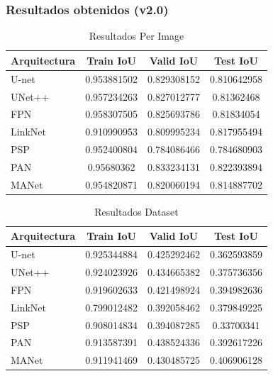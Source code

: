 \begin{frame}[allowframebreaks]
\frametitle{Resultados obtenidos (v2.0)}
\begin{table}[h!]
    \centering
    \begin{tabular}{|l|c|c|c|}
        \hline
        Arquitectura & Train IoU & Valid IoU & Test IoU \\
         \hline
        U-net & 0.953881502 & 0.829308152 & 0.810642958 \\
        UNet++ & 0.957234263 & 0.827012777 & 0.81362468 \\
        FPN & 0.958307505 & 0.825693786 & 0.81834054 \\
        LinkNet & 0.910990953 & 0.809995234 & 0.817955494 \\
        PSP & 0.952400804 & 0.784086466 & 0.784680903 \\
        PAN & 0.95680362 & 0.833234131 & 0.822393894 \\
        MANet & 0.954820871 & 0.820060194 & 0.814887702 \\
        \hline
    \end{tabular}
    \caption{Resultados Per Image}
    \label{tab:resultados_per_image}
\end{table}

\begin{table}[h!]
    \centering
    \begin{tabular}{|l|c|c|c|}
        \hline
        Arquitectura & Train IoU & Valid IoU & Test IoU \\
         \hline
        U-net & 0.925344884 & 0.425292462 & 0.362593859 \\
        UNet++ & 0.924023926 & 0.434665382 & 0.375736356 \\
        FPN & 0.919602633 & 0.421498924 & 0.394982636 \\
        LinkNet & 0.799012482 & 0.392058462 & 0.379849225 \\
        PSP & 0.908014834 & 0.394087285 & 0.33700341 \\
        PAN & 0.913587391 & 0.438524336 & 0.392617226 \\
        MANet & 0.911941469 & 0.430485725 & 0.406906128 \\
        \hline
    \end{tabular}
    \caption{Resultados Dataset}
    \label{tab:resultados_dataset}
\end{table}
\end{frame}

